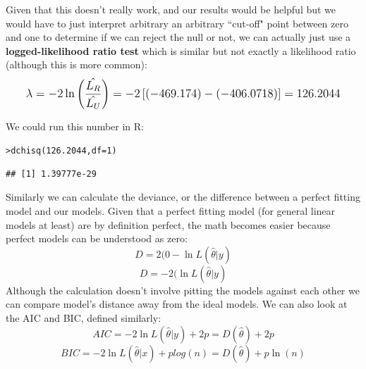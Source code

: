\documentclass[12pt]{article}\usepackage[]{graphicx}\usepackage[]{color}
\makeatletter
\newcommand{\hlnum}[1]{\textcolor[rgb]{0.82,0.78,0.62}{#1}}%
\newcommand{\hlstd}[1]{\textcolor[rgb]{0.882,0.878,0.898}{#1}}%
\newcommand{\hlkwc}[1]{\textcolor[rgb]{0.812,0.522,0.388}{#1}}%
\newcommand{\hlkwd}[1]{\textcolor[rgb]{0.733,0.388,0.812}{#1}}%
\newenvironment{kframe}{%
 \def\at@end@of@kframe{}%
 \ifinner\ifhmode%
  \def\at@end@of@kframe{\end{minipage}}%
  \begin{minipage}{\columnwidth}%
 \fi\fi%
 \def\FrameCommand##1{\hskip\@totalleftmargin \hskip-\fboxsep
 \colorbox{shadecolor}{##1}\hskip-\fboxsep
     \hskip-\linewidth \hskip-\@totalleftmargin \hskip\columnwidth}%
 \MakeFramed {\advance\hsize-\width
   \@totalleftmargin\z@ \linewidth\hsize
   \@setminipage}}%
 {\par\unskip\endMakeFramed%
 \at@end@of@kframe}
\newenvironment{knitrout}{}{} %
\makeatother
\begin{document}
\begin{flushleft}
Given that this doesn't really work, and our results would be helpful but we would have to just interpret arbitrary an arbitrary ``cut-off" point between zero and one to determine if we can reject the null or not, we can actually just use a \textbf{logged-likelihood ratio test} which is similar but not exactly a likelihood ratio (although this is more common):\\
\begin{equation}
\mathlarger{  \lambda = -2 \ln \left( \frac{ \hat{L_R}}{ \hat{L_U}}  \right) = -2 \left[(-469.174) - (-406.0718) \right] = 126.2044  }
\end{equation}


We could run this number in R: \\

\begin{knitrout}
\color{fgcolor}\begin{kframe}
\begin{alltt}
\hlstd{> }\hlkwd{dchisq}\hlstd{(}\hlnum{126.2044}\hlstd{,} \hlkwc{df}\hlstd{=}\hlnum{1}\hlstd{)}
\end{alltt}
\begin{verbatim}
## [1] 1.39777e-29
\end{verbatim}
\end{kframe}
\end{knitrout}


Similarly we can calculate the deviance, or the difference between a perfect fitting model and our models. Given that a perfect fitting model (for general linear models at least) are by definition perfect, the math becomes easier because perfect models can be understood as zero: \\
\begin{equation}
D = 2(0- \ln L(\hat{\theta} \vert y)
\end{equation}
\begin{equation}
 D = -2( \ln L(\hat{\theta} \vert y)
\end{equation}
Although the calculation doesn't involve pitting the models against each other we can compare model's distance away from the ideal models. We can also look at the AIC and BIC, defined similarly:\\
\begin{equation}
AIC = -2 \ln L(\hat{\theta} \vert y) + 2p = D(\hat{\theta} ) +2p
\end{equation}
\begin{equation}
BIC = -2 \ln L(\hat{\theta} \vert x) +plog(n) = D(\hat{\theta}) + p \ln (n)
\end{equation}



\end{flushleft}
\end{document}
